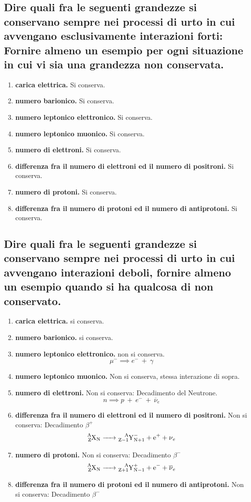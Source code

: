 \subsection[ Conservazione di alcune grandezze per interazioni forti]{Dire quali fra le seguenti grandezze si conservano sempre nei processi di urto in cui avvengano esclusivamente interazioni forti:  Fornire almeno un esempio per ogni situazione in cui vi sia una grandezza non conservata.}
\begin{enumerate}
	\item \textbf{carica elettrica.} Si conserva.
	\item \textbf{numero barionico.} Si conserva.
	\item \textbf{numero leptonico elettronico.} Si conserva.
	\item \textbf{numero leptonico muonico.} Si conserva.
	\item \textbf{numero di elettroni.} Si conserva.
	\item \textbf{differenza fra il numero di elettroni ed il numero di positroni.} Si conserva.  
	\item \textbf{numero di protoni.} Si conserva.
	\item \textbf{differenza fra il numero di protoni ed il numero di antiprotoni.} Si conserva.
\end{enumerate}


\subsection[$\ $ Conservazione di alcune grandezze per interazioni deboli]{Dire quali fra le seguenti grandezze si conservano sempre nei processi di urto in cui avvengano interazioni deboli, fornire almeno un esempio quando si ha qualcosa di non conservato.}
\begin{enumerate}
	\item \textbf{carica elettrica.} si conserva.
	\item \textbf{numero barionico.} si conserva.
	\item \textbf{numero leptonico elettronico.} non si conserva.
	\[
		\mu^- \implies e^- \ + \ \gamma
	\]
	\item \textbf{numero leptonico muonico.} Non si conserva, stessa interazione di sopra.
	\item \textbf{numero di elettroni.} Non si conserva: Decadimento del Neutrone.
	\[
		n \implies p \ + \ e^- \ + \ \overline{\nu}_{e}
	\] 
	\item \textbf{differenza fra il numero di elettroni ed il numero di positroni.} Non si conserva: Decadimento $\beta^+$
	\[	
		\ce{\ce{^{A}_{Z}X_{N}} -> \ce{^{A}_{Z-1}Y^{-}_{N+1}} + e^{+} + \nu_{e} }
	\] 
	\item \textbf{numero di protoni.} Non si conserva: Decadimento $\beta^-$
	\[
		\ce{\ce{^{A}_{Z}X_{N}} -> \ce{^{A}_{Z+1}Y^{+}_{N-1}} + e^{-} + \overline{\nu}_{e} }
	\] 
	\item \textbf{differenza fra il numero di protoni ed il numero di antiprotoni.} Non si conserva: Decadimento $\beta^-$ 
\end{enumerate}

